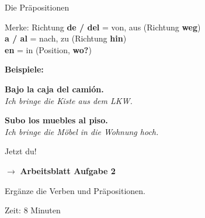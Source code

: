 \documentclass[aspectratio=169, 11pt]{beamer}
\newcommand{\seriftext}[1]{{\fontfamily{ppl}\selectfont #1}}
\newcommand{\es}[1]{\seriftext{\textbf{#1}}}
\newcommand{\de}[1]{\textit{\textcolor{mittelgrau}{#1}}}
\newcommand{\abmark}[1]{{\Large$\rightarrow$ \textbf{Arbeitsblatt Aufgabe #1}}}
\begin{document}
\begin{frame}{Die Präpositionen}
    \vspace{0.5cm}

    \begin{block}{Merke: Richtung}
        \textbf{de / del} = von, aus (Richtung \textbf{weg})\\
        \textbf{a / al} = nach, zu (Richtung \textbf{hin})\\
        \textbf{en} = in (Position, \textbf{wo?})
    \end{block}

    \vspace{0.5cm}

    \textbf{Beispiele:}

    \vspace{0.3cm}

    \es{Bajo la caja \textbf{del} camión.}\\
    \de{Ich bringe die Kiste aus dem LKW.}

    \vspace{0.3cm}

    \es{Subo los muebles \textbf{al} piso.}\\
    \de{Ich bringe die Möbel in die Wohnung hoch.}
\end{frame}

\begin{frame}{Jetzt du!}
    \vspace{1cm}

    \begin{center}
        \abmark{2}

        \vspace{1cm}

        {\large Ergänze die Verben und Präpositionen.}

        \vspace{0.5cm}

        {\small Zeit: 8 Minuten}
    \end{center}
\end{frame}

\end{document}
